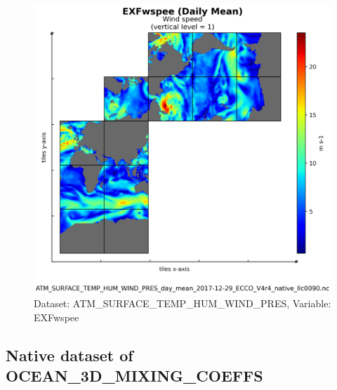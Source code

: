 \begin{figure}[H]
\centering
\includegraphics[scale=0.55]{../images/plots/native_plots/Atmosphere_Surface_Temperature_Humidity_Wind_and_Pressure/EXFwspee.png}
\caption{Dataset: ATM\_SURFACE\_TEMP\_HUM\_WIND\_PRES, Variable: EXFwspee}
\label{tab:table-ATM_SURFACE_TEMP_HUM_WIND_PRES_EXFwspee-Plot}
\end{figure}
\newpage
\subsection{Native dataset of OCEAN\_3D\_MIXING\_COEFFS}
\newp

